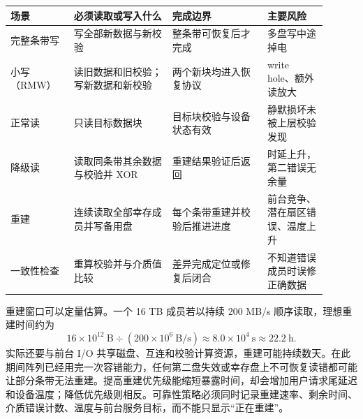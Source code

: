 \begin{longtable}{L{0.18\linewidth}L{0.28\linewidth}L{0.27\linewidth}L{0.17\linewidth}}
\toprule
场景 & 必须读取或写入什么 & 完成边界 & 主要风险 \\
\midrule
完整条带写 & 写全部新数据与新校验 & 整条带可恢复后才完成 & 多盘写中途掉电 \\\tablerowrule
小写（RMW） & 读旧数据和旧校验；写新数据和新校验 & 两个新块均进入恢复协议 & write hole、额外读放大 \\\tablerowrule
正常读 & 只读目标数据块 & 目标块校验与设备状态有效 & 静默损坏未被上层校验发现 \\\tablerowrule
降级读 & 读取同条带其余数据与校验并 XOR & 重建结果验证后返回 & 时延上升，第二错误无余量 \\\tablerowrule
重建 & 连续读取全部幸存成员并写备用盘 & 每个条带重建并校验后推进进度 & 前台竞争、潜在扇区错误、温度上升 \\\tablerowrule
一致性检查 & 重算校验并与介质值比较 & 差异完成定位或修复后闭合 & 不知道错误成员时误修正确数据 \\
\bottomrule
\end{longtable}

重建窗口可以定量估算。一个 16 TB 成员若以持续 200 MB/s 顺序读取，理想重建时间约为
\[
16\times10^{12}\ \mathrm{B}\div(200\times10^{6}\ \mathrm{B/s})
\approx 8.0\times10^4\ \mathrm{s}\approx22.2\ \mathrm{h}.
\]
实际还要与前台 I/O 共享磁盘、互连和校验计算资源，重建可能持续数天。在此期间阵列已经用完一次容错能力，任何第二盘失效或幸存盘上不可恢复读错都可能让部分条带无法重建。提高重建优先级能缩短暴露时间，却会增加用户请求尾延迟和设备温度；降低优先级则相反。可靠性策略必须同时记录重建速率、剩余时间、介质错误计数、温度与前台服务目标，而不能只显示“正在重建”。
